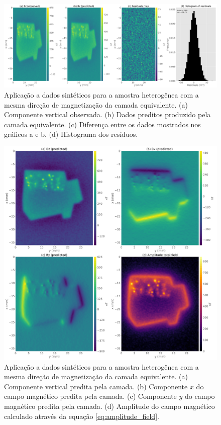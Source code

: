 \begin{figure}
	\centering
	\includegraphics[width=.9\textwidth]{Fig/mag_vec/simulacao_real_correto/results_data_fitting_Bz.png}
	\caption{Aplicação a dados sintéticos para a amostra heterogênea com a mesma direção de magnetização da camada equivalente. (a) Componente vertical observada. (b) Dados preditos produzido pela camada equivalente. (c) Diferença entre os dados mostrados nos gráficos a e b. (d) Histograma dos resíduos.}
	\label{fig:datafit_hetero_sample_samedir}
\end{figure}

\begin{figure}
	\centering
	\includegraphics[width=1.\textwidth]{Fig/mag_vec/simulacao_real_correto/field_components_eqlayer.png}
	\caption{Aplicação a dados sintéticos para a amostra heterogênea com a mesma direção de magnetização da camada equivalente. (a) Componente vertical predita pela camada. (b) Componente $x$ do campo magnético predita pela camada. (c) Componente $y$ do campo magnético predita pela camada. (d) Amplitude do campo magnético calculado através da equação \ref{eq:amplitude_field}.}
	\label{fig:components_hetero_sample_samedir}
\end{figure}

